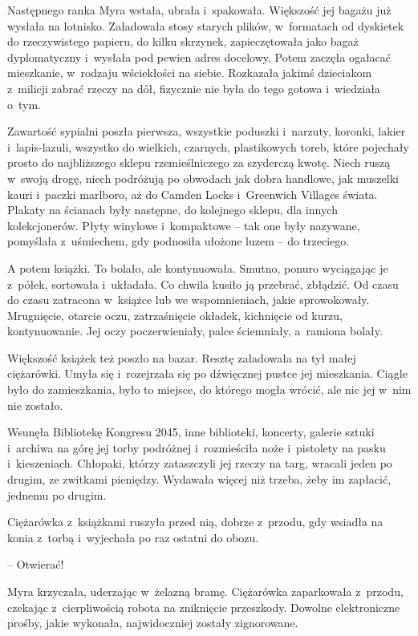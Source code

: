 \documentclass[oneside,polish,11pt,sfheadings]{mwbk}
\begin{document}
Następnego ranka Myra wstała, ubrała i~spakowała. Większość jej bagażu
już wysłała na lotnisko. Załadowała stosy starych plików, w~formatach od
dyskietek do rzeczywistego papieru, do kilku skrzynek, zapieczętowała
jako bagaż dyplomatyczny i~wysłała pod pewien adres docelowy. Potem
zaczęła ogałacać mieszkanie, w~rodzaju wściekłości na siebie. Rozkazała
jakimś dzieciakom z~milicji zabrać rzeczy na dół, fizycznie nie była do
tego gotowa i~wiedziała o~tym.

Zawartość sypialni poszła pierwsza, wszystkie poduszki i~narzuty,
koronki, lakier i~lapis-lazuli, wszystko do wielkich, czarnych,
plastikowych toreb, które pojechały prosto do najbliższego sklepu
rzemieślniczego za szyderczą kwotę. Niech ruszą w~swoją drogę, niech
podróżują po obwodach jak dobra handlowe, jak muszelki kauri i~paczki
marlboro, aż do Camden Locks i~Greenwich Villages świata. Plakaty na
ścianach były następne, do kolejnego sklepu, dla innych kolekcjonerów.
Płyty winylowe i~kompaktowe -- tak one były nazywane, pomyślała z~uśmiechem, gdy podnosiła ułożone luzem -- do trzeciego.

A potem książki. To bolało, ale kontynuowała. Smutno, ponuro wyciągając
je z~półek, sortowała i~układała. Co chwila kusiło ją przebrać,
zbłądzić. Od czasu do czasu zatracona w~książce lub we wspomnieniach,
jakie sprowokowały. Mrugnięcie, otarcie oczu, zatrzaśnięcie okładek,
kichnięcie od kurzu, kontynuowanie. Jej oczy poczerwieniały, palce
ściemniały, a~ramiona bolały.

Większość książek też poszło na bazar. Resztę załadowała na tył małej
ciężarówki. Umyła się i~rozejrzała się po dźwięcznej pustce jej
mieszkania. Ciągle było do zamieszkania, było to miejsce, do którego
mogła wrócić, ale nic jej w~nim nie zostało.

Wsunęła Bibliotekę Kongresu 2045, inne biblioteki, koncerty, galerie
sztuki i~archiwa na górę jej torby podróżnej i~rozmieściła noże i~pistolety na pasku i~kieszeniach. Chłopaki, którzy zataszczyli jej
rzeczy na targ, wracali jeden po drugim, ze zwitkami pieniędzy. Wydawała
więcej niż trzeba, żeby im zapłacić, jednemu po drugim.

Ciężarówka z~książkami ruszyła przed nią, dobrze z~przodu, gdy wsiadła
na konia z~torbą i~wyjechała po raz ostatni do obozu.

-- Otwierać!

Myra krzyczała, uderzając w~żelazną bramę. Ciężarówka zaparkowała z~przodu, czekając z~cierpliwością robota na zniknięcie przeszkody.
Dowolne elektroniczne prośby, jakie wykonała, najwidoczniej zostały
zignorowane.
\end{document}
